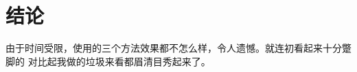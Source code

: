 \documentclass[twocolumn,11pt]{ctexart}
\begin{document}
\section{结论}

由于时间受限，使用的三个方法效果都不怎么样，令人遗憾。就连初看起来十分蹩脚的\cite{horsley2017building}
对比起我做的垃圾来看都眉清目秀起来了。

 

%
\end{document}
